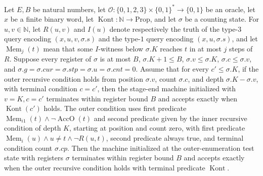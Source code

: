 \begin{theorem}
\label{Complexity.LogProg.ISGen.gvloop}
\leanok
{}
Let $E,B$ be natural numbers, let $\mathcal O:\{0,1,2,3\}\times\{0,1\}^*\to\{0,1\}$ be
an oracle, let $x$ be a finite binary word, let $\operatorname{Kont}:\mathbb
N\to\mathrm{Prop}$, and let $\sigma$ be a counting state. For $u,v\in\mathbb N$, let
$R(u,v)$ and $I(u)$ denote respectively the truth of the type-$3$ query encoding
$(x,u,v,\sigma.s)$ and the type-$1$ query encoding $(x,u,\sigma.s)$, and let
$\operatorname{Mem}_j(t)$ mean that some $I$-witness below $\sigma.K$ reaches $t$ in at
most $j$ steps of $R$. Suppose every register of $\sigma$ is at most $B$, $\sigma.K+1\le
B$, $\sigma.v\le\sigma.K$, $\sigma.c\le\sigma.v$, and
$\sigma.g=\sigma.cur=\sigma.stp=\sigma.u=\sigma.cnt=0$. Assume that for every
$c'\le\sigma.K$, if the outer recursive condition holds from position $\sigma.v$, count
$\sigma.c$, and depth $\sigma.K-\sigma.v$, with terminal condition $c=c'$, then the
stage-end machine initialized with $v=K,c=c'$ terminates within register bound $B$ and
accepts exactly when $\operatorname{Kont}(c')$ holds. The outer condition uses first
predicate $\operatorname{Mem}_{i1}(t)\land\neg\operatorname{AccO}(t)$ and second
predicate given by the inner recursive condition of depth $K$, starting at position and
count zero, with first predicate $\operatorname{Mem}_i(u)\land u\ne t\land\neg R(u,t)$,
second predicate always true, and terminal condition count $\sigma.cp$. Then the machine
initialized at the outer-enumeration test state with registers $\sigma$ terminates
within register bound $B$ and accepts exactly when the outer recursive condition holds
with terminal predicate $\operatorname{Kont}$.
\end{theorem}

